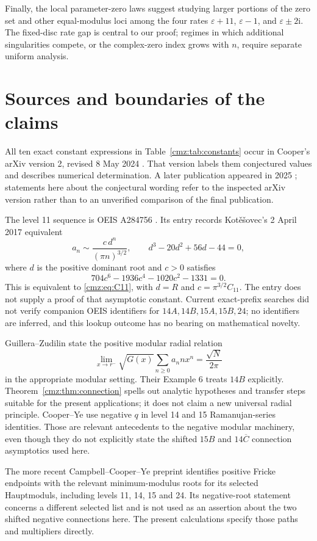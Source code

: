 \documentclass[11pt,letterpaper]{article}
\numberwithin{equation}{section}
\theoremstyle{definition}\newtheorem{definition}[theorem]{Definition}
\theoremstyle{remark}\newtheorem{remark}[theorem]{Remark}
\newcommand{\eps}{\varepsilon}
\newcommand{\ii}{\mathrm i}
\begin{document}
Finally, the local parameter-zero laws suggest studying larger portions of the zero set and other equal-modulus loci among the four rates $\eps+11$, $\eps-1$, and $\eps\pm2\ii$. The fixed-disc rate gap is central to our proof; regimes in which additional singularities compete, or the complex-zero index grows with $n$, require separate uniform analysis.

\section{Sources and boundaries of the claims}
\label{cmz:sec:sources}
All ten exact constant expressions in Table~\ref{cmz:tab:constants} occur in Cooper's arXiv version 2, revised 8 May 2024 \cite[Section 10, Table 8]{Cooper}. That version labels them conjectured values and describes numerical determination. A later publication appeared in 2025 \cite{CooperPub}; statements here about the conjectural wording refer to the inspected arXiv version rather than to an unverified comparison of the final publication.

The level 11 sequence is OEIS A284756 \cite{OEIS}. Its entry records Kot\v{e}\v{s}ovec's 2 April 2017 equivalent
\[
a_n\sim\frac{c\,d^n}{(\pi n)^{3/2}},\qquad
 d^3-20d^2+56d-44=0,
\]
where $d$ is the positive dominant root and $c>0$ satisfies
\[
704c^6-1936c^4-1020c^2-1331=0.
\]
This is equivalent to \eqref{cmz:eq:C11}, with $d=R$ and $c=\pi^{3/2}C_{11}$. The entry does not supply a proof of that asymptotic constant. Current exact-prefix searches did not verify companion OEIS identifiers for $14A,14B,15A,15B,24$; no identifiers are inferred, and this lookup outcome has no bearing on mathematical novelty.

Guillera--Zudilin \cite[(27)]{GZ} state the positive modular radial relation
\[
\lim_{x\to r^-}\sqrt{G(x)}\sum_{n\geq0}a_n n x^n
 =\frac{\sqrt N}{2\pi}
\]
in the appropriate modular setting. Their Example 6 treats $14B$ explicitly. Theorem~\ref{cmz:thm:connection} spells out analytic hypotheses and transfer steps suitable for the present applications; it does not claim a new universal radial principle. Cooper--Ye \cite[Theorems 7.2 and 7.4]{CY} use negative $q$ in level 14 and 15 Ramanujan-series identities. Those are relevant antecedents to the negative modular machinery, even though they do not explicitly state the shifted $15B$ and $14\overline C$ connection asymptotics used here.

The more recent Campbell--Cooper--Ye preprint \cite[Theorem 6.1(1)]{CCY} identifies positive Fricke endpoints with the relevant minimum-modulus roots for its selected Hauptmoduls, including levels 11, 14, 15 and 24. Its negative-root statement concerns a different selected list and is not used as an assertion about the two shifted negative connections here. The present calculations specify those paths and multipliers directly.
\end{document}
